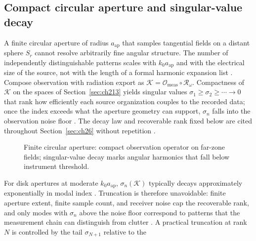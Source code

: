 \subsection{Compact circular aperture and singular-value decay}
\label{sec:ch26.signature-aperture}
A finite circular aperture of radius $a_{\mathrm{ap}}$ that samples tangential fields on a distant
sphere $S_r$ cannot resolve arbitrarily fine angular structure. The number of independently
distinguishable patterns scales with $k_0 a_{\mathrm{ap}}$ and with the electrical size of the
source, not with the length of a formal harmonic expansion list \cite{chu1948,hansen1988}.
Compose observation with radiation export as
$\mathcal{K}=\mathcal{O}_{\mathrm{meas}}\circ\mathcal{R}_\omega$. Compactness of $\mathcal{K}$
on the spaces of Section~\ref{sec:ch213} yields singular values
$\sigma_1\ge\sigma_2\ge\cdots\to 0$ that rank how efficiently each source organization couples
to the recorded data; once the index exceeds what the aperture geometry can support, $\sigma_n$
falls into the observation noise floor \cite{stratton1941,hansen1988}. The decay law and
recoverable rank fixed below are cited throughout Section~\ref{sec:ch26} without repetition
\cite{harrington2001}.
\begin{figure}[t]
\centering
{}
\caption{Finite circular aperture: compact observation operator on far-zone fields;
singular-value decay marks angular harmonics that fall below instrument threshold.}
\label{fig:ch2.signature-aperture-svd}
\end{figure}
For disk apertures at moderate $k_0 a_{\mathrm{ap}}$, $\sigma_n(\mathcal{K})$ typically decays
approximately exponentially in modal index \cite{stratton1941}. Truncation is therefore
unavoidable: finite aperture extent, finite sample count, and receiver noise cap the
recoverable rank, and only modes with $\sigma_n$ above the noise floor correspond to patterns
that the measurement chain can distinguish from clutter \cite{hansen1988,stratton1941}. A
practical truncation at rank $N$ is controlled by the tail $\sigma_{N+1}$ relative to the
